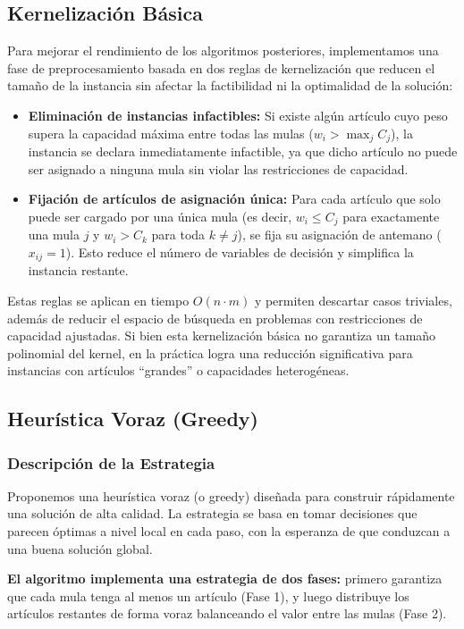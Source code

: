 \documentclass[12pt, a4paper]{article}
\begin{document}
    \subsection{Kernelización Básica}
    Para mejorar el rendimiento de los algoritmos posteriores, implementamos una fase de preprocesamiento basada en dos reglas de kernelización que reducen el tamaño de la instancia sin afectar la factibilidad ni la optimalidad de la solución:

    \begin{itemize}
        \item \textbf{Eliminación de instancias infactibles:} Si existe algún artículo cuyo peso supera la capacidad máxima entre todas las mulas ($w_i > \max_j C_j$), la instancia se declara inmediatamente infactible, ya que dicho artículo no puede ser asignado a ninguna mula sin violar las restricciones de capacidad.
        \item \textbf{Fijación de artículos de asignación única:} Para cada artículo que solo puede ser cargado por una única mula (es decir, $w_i \leq C_j$ para exactamente una mula $j$ y $w_i > C_k$ para toda $k \neq j$), se fija su asignación de antemano ($x_{ij} = 1$). Esto reduce el número de variables de decisión y simplifica la instancia restante.
    \end{itemize}

    Estas reglas se aplican en tiempo $O(n \cdot m)$ y permiten descartar casos triviales, además de reducir el espacio de búsqueda en problemas con restricciones de capacidad ajustadas. Si bien esta kernelización básica no garantiza un tamaño polinomial del kernel, en la práctica logra una reducción significativa para instancias con artículos ``grandes'' o capacidades heterogéneas.

    \subsection{Heurística Voraz (Greedy)}
    \subsubsection{Descripción de la Estrategia}
    Proponemos una heurística voraz (o greedy) diseñada para construir rápidamente una solución de alta calidad. La estrategia se basa en tomar decisiones que parecen óptimas a nivel local en cada paso, con la esperanza de que conduzcan a una buena solución global.

    \textbf{El algoritmo implementa una estrategia de dos fases:} primero garantiza que cada mula tenga al menos un artículo (Fase 1), y luego distribuye los artículos restantes de forma voraz balanceando el valor entre las mulas (Fase 2).
\end{document}
